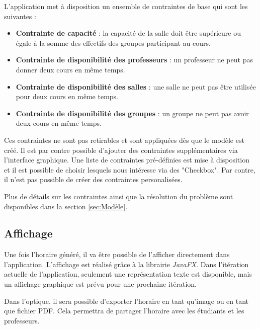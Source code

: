 L'application met à disposition un ensemble de contraintes de base qui sont les suivantes :
\begin{itemize}
    \item \textbf{Contrainte de capacité} : la capacité de la salle doit être supérieure ou égale à la somme des effectifs des groupes participant au cours.
    \item \textbf{Contrainte de disponibilité des professeurs} : un professeur ne peut pas donner deux cours en même temps.
    \item \textbf{Contrainte de disponibilité des salles} : une salle ne peut pas être utilisée pour deux cours en même temps.
    \item \textbf{Contrainte de disponibilité des groupes} : un groupe ne peut pas avoir deux cours en même temps.
\end{itemize}

Ces contraintes ne sont pas retirables et sont appliquées dès que le modèle est créé. Il est par contre possible d'ajouter des contraintes supplémentaires via l'interface graphique. Une liste de contraintes pré-définies est mise à disposition et il est possible de choisir lesquels nous intéresse via des "Checkbox". Par contre, il n'est pas possible de créer des contraintes personalisées.

Plus de détails sur les contraintes ainsi que la résolution du problème sont disponibles dans la section \ref{sec:Modèle}.

\subsection{Affichage}

Une fois l'horaire généré, il va être possible de l'afficher directement dans l'application. L'affichage est réalisé grâce à la librairie \textit{JavaFX}. Dans l'itération actuelle de l'application, seulement une représentation texte est disponible, mais un affichage graphique est prévu pour une prochaine itération.

Dans l'optique, il sera possible d'exporter l'horaire en tant qu'image ou en tant que fichier PDF. Cela permettra de partager l'horaire avec les étudiants et les professeurs.